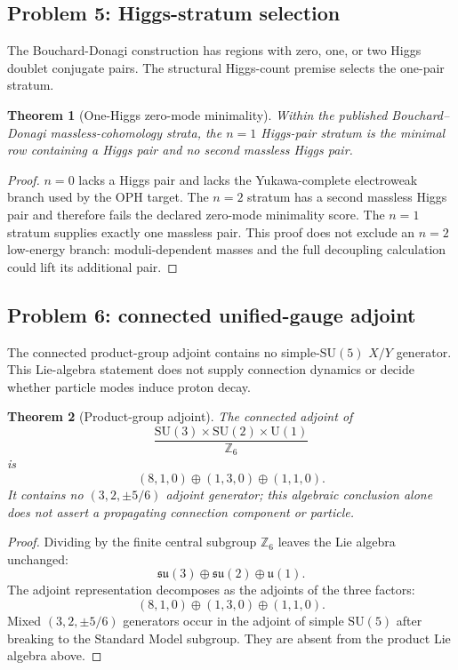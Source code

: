 \documentclass[11pt]{article}
\newtheorem{theorem}{Theorem}[section]
\theoremstyle{remark}
\theoremstyle{plain}
\newcommand{\SU}{\mathrm{SU}}
\newcommand{\U}{\mathrm{U}}
\newcommand{\Z}{\mathbb Z}
\begin{document}
\subsection{Problem 5: Higgs-stratum selection}

The Bouchard-Donagi construction has regions with zero, one, or two Higgs doublet conjugate
pairs. The structural Higgs-count premise selects the one-pair stratum.

\begin{theorem}[One-Higgs zero-mode minimality]
Within the published Bouchard--Donagi massless-cohomology strata, the \(n=1\) Higgs-pair
stratum is the minimal row containing a Higgs pair and no second massless Higgs pair.
\end{theorem}

\begin{proof}
\(n=0\) lacks a Higgs pair and lacks the Yukawa-complete electroweak branch
used by the OPH target. The \(n=2\) stratum has a second massless Higgs pair and therefore fails
the declared zero-mode minimality score. The \(n=1\) stratum supplies exactly one massless pair.
This proof does not exclude an \(n=2\) low-energy branch: moduli-dependent masses and the full
decoupling calculation could lift its additional pair.
\end{proof}

\subsection{Problem 6: connected unified-gauge adjoint}

The connected product-group adjoint contains no simple-\(\SU(5)\) \(X/Y\) generator.
This Lie-algebra statement does not supply connection dynamics or decide whether particle modes
induce proton decay.

\begin{theorem}[Product-group adjoint]
The connected adjoint of
\[
\frac{\SU(3)\times\SU(2)\times\U(1)}{\Z_6}
\]
is
\[
(8,1,0)\oplus(1,3,0)\oplus(1,1,0).
\]
It contains no \((3,2,\pm5/6)\) adjoint generator; this algebraic conclusion alone does not
assert a propagating connection component or particle.
\end{theorem}

\begin{proof}
Dividing by the finite central subgroup \(\Z_6\) leaves the Lie algebra unchanged:
\[
\mathfrak{su}(3)\oplus\mathfrak{su}(2)\oplus\mathfrak{u}(1).
\]
The adjoint representation decomposes as the adjoints of the three factors:
\[
(8,1,0)\oplus(1,3,0)\oplus(1,1,0).
\]
Mixed \((3,2,\pm5/6)\) generators occur in the adjoint of simple \(\SU(5)\) after breaking to
the Standard Model subgroup. They are absent from the product Lie algebra above.
\end{proof}
\end{document}
